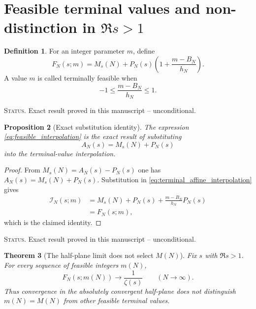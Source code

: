 \documentclass[11pt]{amsart}
\numberwithin{equation}{section}
\theoremstyle{plain}
\newtheorem{theorem}{Theorem}[section]
\newtheorem{proposition}[theorem]{Proposition}
\theoremstyle{definition}
\newtheorem{definition}[theorem]{Definition}
\theoremstyle{remark}
\newcommand{\1}{\mathbf{1}}
\newcommand{\statusnote}[1]{%
  \par\smallskip\noindent
  \begingroup\footnotesize\textsc{Status.} #1\endgroup
  \par\smallskip}
\begin{document}
\section{Feasible terminal values and non-distinction in \texorpdfstring{\(\Re s>1\)}{Re(s)>1}}
\label{sec:feasible_values}

\begin{definition}
\label{def:feasible_interpolation}
For an integer parameter \(m\), define
\begin{equation}
F_N(s;m)
=
M_s(N)
+
P_N(s)
\left(
1+\frac{m-B_N}{h_N}
\right).
\label{eq:feasible_interpolation}
\end{equation}
A value \(m\) is called terminally feasible when
\begin{equation}
-1\leq\frac{m-B_N}{h_N}\leq1.
\label{eq:feasible_interval}
\end{equation}
\end{definition}

\statusnote{Exact result proved in this manuscript -- unconditional.}
\begin{proposition}[Exact substitution identity]
\label{prop:feasible_exact_identity}
The expression \eqref{eq:feasible_interpolation} is the exact result of
substituting
\begin{equation}
A_N(s)=M_s(N)+P_N(s)
\label{eq:A_M_plus_P}
\end{equation}
into the terminal-value interpolation.
\end{proposition}

\begin{proof}
From \(M_s(N)=A_N(s)-P_N(s)\) one has
\(A_N(s)=M_s(N)+P_N(s)\).  Substitution in
\eqref{eq:terminal_affine_interpolation} gives
\begin{align}
\mathcal I_N(s;m)
&=
M_s(N)+P_N(s)
+\frac{m-B_N}{h_N}P_N(s)
\label{eq:feasible_substitution_step}
\\
&=
F_N(s;m),
\label{eq:feasible_substitution_result}
\end{align}
which is the claimed identity.
\end{proof}

\statusnote{Exact result proved in this manuscript -- unconditional.}
\begin{theorem}[The half-plane limit does not select \(M(N)\)]
\label{thm:halfplane_nondistinction}
Fix \(s\) with \(\Re s>1\).  For every sequence of feasible integers
\(m(N)\),
\begin{equation}
\boxed{
F_N(s;m(N))
\longrightarrow
\frac1{\zeta(s)}
\qquad
(N\to\infty).
}
\label{eq:halfplane_nondistinction}
\end{equation}
Thus convergence in the absolutely convergent half-plane does not
distinguish \(m(N)=M(N)\) from other feasible terminal values.
\end{theorem}
\end{document}
